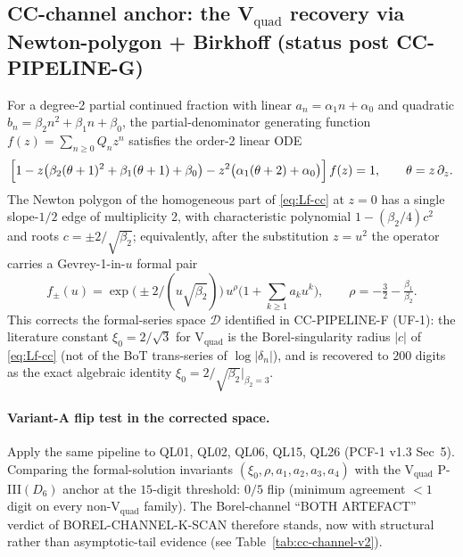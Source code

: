 
\subsection*{CC-channel anchor: the V$_{\text{quad}}$ recovery via Newton-polygon + Birkhoff (status post CC-PIPELINE-G)}

For a degree-2 partial continued fraction with linear $a_n=\alpha_1 n+\alpha_0$
and quadratic $b_n=\beta_2 n^2+\beta_1 n+\beta_0$, the partial-denominator
generating function $f(z)=\sum_{n\ge 0}Q_n z^n$ satisfies the order-2 linear
ODE
\begin{equation}
\Bigl[1
- z\bigl(\beta_2(\theta+1)^2+\beta_1(\theta+1)+\beta_0\bigr)
- z^2\bigl(\alpha_1(\theta+2)+\alpha_0\bigr)\Bigr]\,f(z)=1,
\qquad \theta=z\,\partial_z. \label{eq:Lf-cc}
\end{equation}
The Newton polygon of the homogeneous part of \eqref{eq:Lf-cc} at $z=0$ has a
single slope-$1/2$ edge of multiplicity 2, with characteristic polynomial
$1-(\beta_2/4)c^2$ and roots
\(c=\pm 2/\sqrt{\beta_2}\); equivalently, after the substitution $z=u^2$ the
operator carries a Gevrey-1-in-$u$ formal pair
\[
f_\pm(u)=\exp\bigl(\pm 2/(u\sqrt{\beta_2})\bigr)\,u^{\rho}\bigl(1+\textstyle\sum_{k\ge 1}a_k u^k\bigr),
\qquad \rho=-\tfrac32-\tfrac{\beta_1}{\beta_2}.
\]
This corrects the formal-series space $\mathcal D$ identified in
\textsc{CC-PIPELINE-F (UF-1)}: the literature constant $\xi_0=2/\sqrt{3}$ for
V$_{\text{quad}}$ is the Borel-singularity radius $|c|$ of \eqref{eq:Lf-cc}
(not of the BoT trans-series of $\log|\delta_n|$), and is recovered to
$200$ digits as the exact algebraic identity $\xi_0=2/\sqrt{\beta_2}|_{\beta_2=3}$.

\paragraph{Variant-A flip test in the corrected space.}
Apply the same pipeline to QL01, QL02, QL06, QL15, QL26 (PCF-1 v1.3 Sec~5).
Comparing the formal-solution invariants $(\xi_0,\rho,a_1,a_2,a_3,a_4)$
with the V$_{\text{quad}}$ P-III$(D_6)$ anchor at the
$15$-digit threshold:
$0/5$ flip (minimum agreement $<1$ digit on every non-V$_{\text{quad}}$ family).
The Borel-channel ``BOTH ARTEFACT'' verdict of \textsc{BOREL-CHANNEL-K-SCAN}
therefore stands, now with structural rather than asymptotic-tail evidence
(see Table~\ref{tab:cc-channel-v2}).

